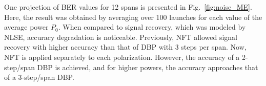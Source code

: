 One projection of BER values for 12 spans is presented in Fig.~\ref{fig:noise_ME}. Here, the result was obtained by averaging over 100 launches for each value of the average power $P_0$. When compared to signal recovery, which was modeled by NLSE, accuracy degradation is noticeable. Previously, NFT allowed signal recovery with higher accuracy than that of DBP with 3 steps per span. Now, NFT is applied separately to each polarization. However, the accuracy of a 2-step/span DBP is achieved, and for higher powers, the accuracy approaches that of a 3-step/span DBP.